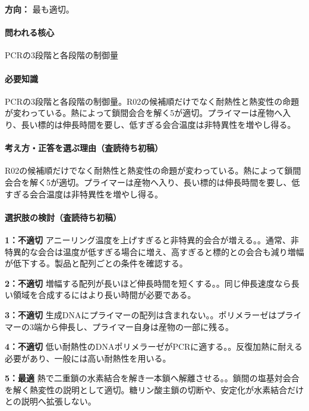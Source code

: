 \noindent\textbf{方向：} 最も適切。\par

\paragraph{問われる核心} PCRの3段階と各段階の制御量

\paragraph{必要知識} PCRの3段階と各段階の制御量。R02の候補順だけでなく耐熱性と熱変性の命題が変わっている。熱によって鎖間会合を解く5が適切。プライマーは産物へ入り、長い標的は伸長時間を要し、低すぎる会合温度は非特異性を増やし得る。

\paragraph{考え方・正答を選ぶ理由（査読待ち初稿）} R02の候補順だけでなく耐熱性と熱変性の命題が変わっている。熱によって鎖間会合を解く5が適切。プライマーは産物へ入り、長い標的は伸長時間を要し、低すぎる会合温度は非特異性を増やし得る。

\paragraph{選択肢の検討（査読待ち初稿）}\mbox{}\par

\noindent\textbf{1：不適切} アニーリング温度を上げすぎると非特異的会合が増える。。通常、非特異的な会合は温度が低すぎる場合に増え、高すぎると標的との会合も減り増幅が低下する。製品と配列ごとの条件を確認する。\par

\noindent\textbf{2：不適切} 増幅する配列が長いほど伸長時間を短くする。。同じ伸長速度なら長い領域を合成するにはより長い時間が必要である。\par

\noindent\textbf{3：不適切} 生成DNAにプライマーの配列は含まれない。。ポリメラーゼはプライマーの3端から伸長し、プライマー自身は産物の一部に残る。\par

\noindent\textbf{4：不適切} 低い耐熱性のDNAポリメラーゼがPCRに適する。。反復加熱に耐える必要があり、一般には高い耐熱性を用いる。\par

\noindent\textbf{5：最適} 熱で二重鎖の水素結合を解き一本鎖へ解離させる。。鎖間の塩基対会合を解く熱変性の説明として適切。糖リン酸主鎖の切断や、安定化が水素結合だけとの説明へ拡張しない。\par

